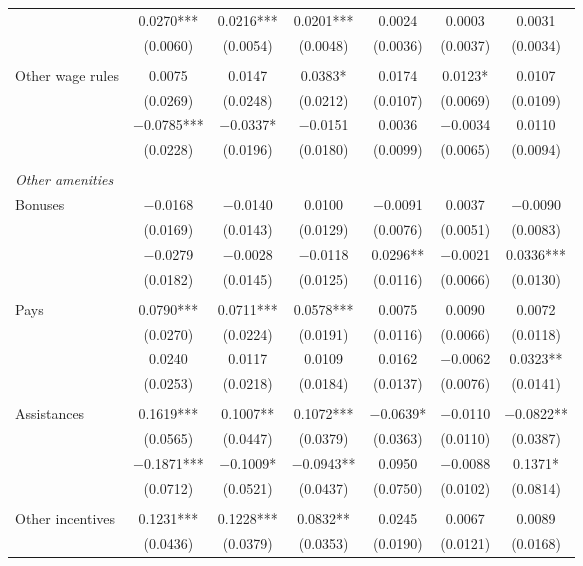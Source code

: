 \documentclass[12pt,letterpaper]{article}
\begin{document}
\begin{longtable}{l cccccc}
  & 0.0270*** & 0.0216*** & 0.0201*** & 0.0024 & 0.0003 & 0.0031 \\
  & (0.0060) & (0.0054) & (0.0048) & (0.0036) & (0.0037) & (0.0034) \\
 & & & & & & \\
\quad Other wage rules & 0.0075 & 0.0147 & 0.0383* & 0.0174 & 0.0123* & 0.0107 \\
  & (0.0269) & (0.0248) & (0.0212) & (0.0107) & (0.0069) & (0.0109) \\
  & $-$0.0785*** & $-$0.0337* & $-$0.0151 & 0.0036 & $-$0.0034 & 0.0110 \\
  & (0.0228) & (0.0196) & (0.0180) & (0.0099) & (0.0065) & (0.0094) \\
 & & & & & & \\
\midrule
\multicolumn{7}{l}{\textit{Other amenities}} \\
\quad Bonuses & $-$0.0168 & $-$0.0140 & 0.0100 & $-$0.0091 & 0.0037 & $-$0.0090 \\
  & (0.0169) & (0.0143) & (0.0129) & (0.0076) & (0.0051) & (0.0083) \\
  & $-$0.0279 & $-$0.0028 & $-$0.0118 & 0.0296** & $-$0.0021 & 0.0336*** \\
  & (0.0182) & (0.0145) & (0.0125) & (0.0116) & (0.0066) & (0.0130) \\
 & & & & & & \\
\quad Pays & 0.0790*** & 0.0711*** & 0.0578*** & 0.0075 & 0.0090 & 0.0072 \\
  & (0.0270) & (0.0224) & (0.0191) & (0.0116) & (0.0066) & (0.0118) \\
  & 0.0240 & 0.0117 & 0.0109 & 0.0162 & $-$0.0062 & 0.0323** \\
  & (0.0253) & (0.0218) & (0.0184) & (0.0137) & (0.0076) & (0.0141) \\
 & & & & & & \\
\quad Assistances & 0.1619*** & 0.1007** & 0.1072*** & $-$0.0639* & $-$0.0110 & $-$0.0822** \\
  & (0.0565) & (0.0447) & (0.0379) & (0.0363) & (0.0110) & (0.0387) \\
  & $-$0.1871*** & $-$0.1009* & $-$0.0943** & 0.0950 & $-$0.0088 & 0.1371* \\
  & (0.0712) & (0.0521) & (0.0437) & (0.0750) & (0.0102) & (0.0814) \\
 & & & & & & \\
\quad Other incentives & 0.1231*** & 0.1228*** & 0.0832** & 0.0245 & 0.0067 & 0.0089 \\
  & (0.0436) & (0.0379) & (0.0353) & (0.0190) & (0.0121) & (0.0168) \\

\end{longtable}
\end{document}
